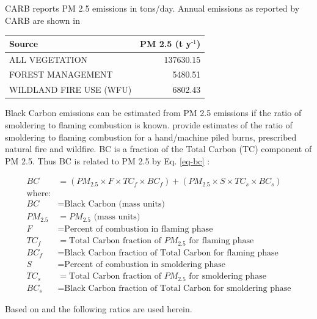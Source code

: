 \documentclass[a4paper]{article}
\begin{document}
CARB reports PM 2.5 emissions in tons/day. Annual emissions  as
reported by CARB are shown in

\begin{center}
\begin{tabular}{lr}
Source & PM 2.5 (t y\(^{\text{-1}}\))\\
\hline
ALL VEGETATION & 137630.15\\
FOREST MANAGEMENT & 5480.51\\
WILDLAND FIRE USE (WFU) & 6802.43\\
\end{tabular}

\end{center}

Black Carbon emissions
can be estimated from PM 2.5 emissions if the ratio of smoldering to
flaming combustion is known. \citet{Ward1989} provide estimates of
the ratio of smoldering to flaming combustion for a hand/machine piled
burns, prescribed natural fire and wildfire. BC is a fraction
of the Total Carbon (TC) component of PM 2.5. Thus BC is related to PM
2.5 by Eq. \eqref{eq-bc} :



\begin{align}
BC &= \left( PM_{2.5} \times F \times TC_f \times BC_f\right) + \left( PM_{2.5} \times S \times TC_s \times BC_s\right) \label{eq-bc} \\
\text{where:} \nonumber \\
BC &= \text{Black Carbon (mass units)} \nonumber \\
PM_{2.5} &= PM_{2.5} \text{ (mass units)} \nonumber \\
F &= \text{Percent of combustion in flaming phase} \nonumber \\
TC_f &= \text{Total Carbon fraction of } PM_{2.5} \text{ for flaming phase} \nonumber \\
BC_f &= \text{Black Carbon fraction of Total Carbon for flaming phase} \nonumber \\
S &= \text{Percent of combustion in smoldering phase} \nonumber \\
TC_s &= \text{Total Carbon fraction of } PM_{2.5} \text{ for smoldering phase} \nonumber \\
BC_s &= \text{Black Carbon fraction of Total Carbon for smoldering phase} \nonumber
\end{align}

Based on \citet{Ward1989} and \citet{Jenk1996} the following ratios are
used herein.
\end{document}
